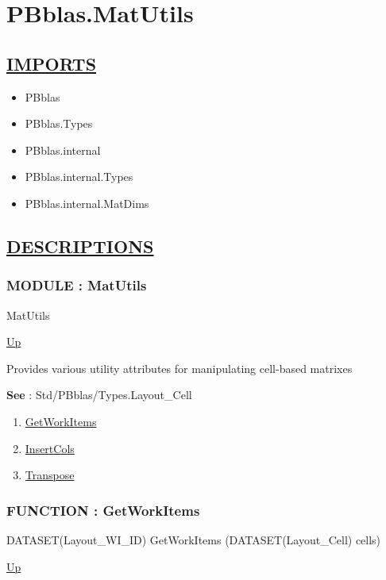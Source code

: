 \chapter*{PBblas.MatUtils}
\hypertarget{ecldoc:toc:PBblas.MatUtils}{}

\section*{\underline{IMPORTS}}
\begin{itemize}
\item PBblas
\item PBblas.Types
\item PBblas.internal
\item PBblas.internal.Types
\item PBblas.internal.MatDims
\end{itemize}

\section*{\underline{DESCRIPTIONS}}
\subsection*{MODULE : MatUtils}
\hypertarget{ecldoc:PBblas.MatUtils}{}
\begin{minipage}[t]{\textwidth}
\begin{flushleft}
 MatUtils 
\end{flushleft}
\end{minipage}
\hyperlink{ecldoc:toc:PBblas}{Up}

\par
Provides various utility attributes for manipulating cell-based matrixes
\par
\textbf{See} : Std/PBblas/Types.Layout\_Cell \\
\begin{enumerate}
\item \hyperlink{ecldoc:pbblas.matutils.getworkitems}{GetWorkItems}
\item \hyperlink{ecldoc:pbblas.matutils.insertcols}{InsertCols}
\item \hyperlink{ecldoc:pbblas.matutils.transpose}{Transpose}
\end{enumerate}
\subsection*{FUNCTION : GetWorkItems}
\hypertarget{ecldoc:pbblas.matutils.getworkitems}{}
\begin{minipage}[t]{\textwidth}
\begin{flushleft}
DATASET(Layout\_WI\_ID) GetWorkItems (DATASET(Layout\_Cell) cells)
\end{flushleft}
\end{minipage}
\hyperlink{ecldoc:PBblas.MatUtils}{Up}

